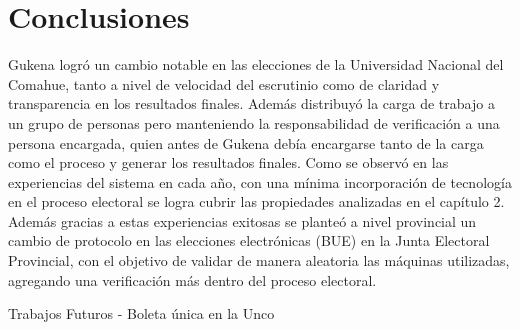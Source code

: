 \label{conclusiones}
\chapter{Conclusiones}
Gukena logró un cambio notable en las elecciones de la Universidad Nacional del Comahue, tanto a nivel de velocidad del escrutinio como de claridad y transparencia en los resultados finales. Además distribuyó la carga de trabajo a un grupo de personas pero manteniendo la responsabilidad de verificación a una persona encargada, quien antes de Gukena debía encargarse tanto de la carga como el proceso y generar los resultados finales. Como se observó en las experiencias del sistema en cada año, con una mínima incorporación de tecnología en el proceso electoral se logra cubrir las propiedades analizadas en el capítulo 2. Además gracias a estas experiencias exitosas se planteó a nivel provincial un cambio de protocolo en las elecciones electrónicas (BUE) en la Junta Electoral Provincial, con el objetivo de validar de manera aleatoria las máquinas utilizadas, agregando una verificación más dentro del proceso electoral.


Trabajos Futuros - Boleta única en la Unco


